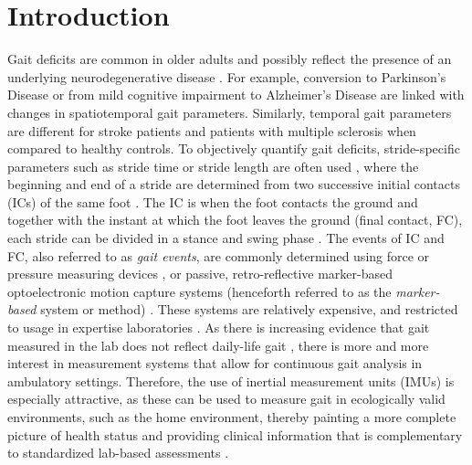 \documentclass[sensors,article,submit,pdftex,moreauthors]{Definitions/mdpi}
\begin{document}
\section{Introduction \label{sec:Introduction}}
Gait deficits are common in older adults and possibly reflect the presence of an underlying neurodegenerative disease \cite{Snijders2007,Hodgins2008}. For example, conversion to Parkinson's Disease \cite{DelDin2019} or from mild cognitive impairment to Alzheimer's Disease \cite{Koenig2017,Bertoli2018} are linked with changes in spatiotemporal gait parameters. Similarly, temporal gait parameters are different for stroke patients \cite{SchroederVon1995,Mohan2021} and patients with multiple sclerosis \cite{Griskevicius2016,Flachenecker2019} when compared to healthy controls. To objectively quantify gait deficits, stride-specific parameters such as stride time or stride length are often used \cite{Hannink2016}, where the beginning and end of a stride are determined from two successive initial contacts (ICs) of the same foot \cite{Perry2010,Whittle2012}. The IC is when the foot contacts the ground and together with the instant at which the foot leaves the ground (final contact, FC), each stride can be divided in a stance and swing phase \cite{Rueterbories2010,Bruening2014}.  The events of IC and FC, also referred to as \emph{gait events}, are commonly determined using force or pressure measuring devices \cite{Bruening2014}, or passive, retro-reflective marker-based optoelectronic motion capture systems (henceforth referred to as the \emph{marker-based} system or method) \cite{Chiari2005,Topley2020}. These systems are relatively expensive, and restricted to usage in expertise laboratories \cite{Iosa2016,Jarchi2018}. As there is increasing evidence that gait measured in the lab does not reflect daily-life gait \cite{Hillel2019,Warmerdam2020,Atrsaei2021}, there is more and more interest in measurement systems that allow for continuous gait analysis in ambulatory settings. Therefore, the use of inertial measurement units (IMUs) is especially attractive, as these can be used to measure gait in ecologically valid environments, such as the home environment, thereby painting a more complete picture of health status \cite{DelDin2016,Shah2020} and providing clinical information that is complementary to standardized lab-based assessments \cite{Warmerdam2020,Fasano2020,Atrsaei2021,Corra2021}.
\end{document}
